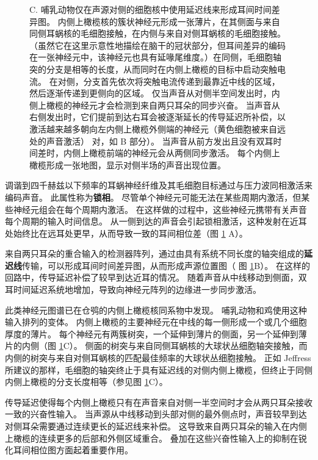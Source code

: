 \begin{figure}[htbp]
{		C. 哺乳动物仅在声源对侧的细胞核中使用延迟线来形成耳间时间差异图。
		内侧上橄榄核的簇状神经元形成一张薄片，在其侧面与来自同侧耳蜗核的毛细胞接触，在内侧与来自对侧耳蜗核的毛细胞接触。 
		（虽然它在这里示意性地描绘在脑干的冠状部分，但耳间差异的编码在一张神经元中，该神经元也具有延喙尾维度。）在同侧，毛细胞轴突的分支是相等的长度，从而同时在内侧上橄榄的目标中启动突触电流。
		在对侧，分支首先依次将突触电流传递到最靠近中线的区域，然后逐渐传递到更侧向的区域。
		仅当声音从对侧半空间发出时，内侧上橄榄的神经元才会检测到来自两只耳朵的同步兴奋。
		当声音从右侧发出时，它们提前到达右耳会被逐渐延长的传导延迟所补偿，以激活越来越多朝向左内侧上橄榄外侧端的神经元（黄色细胞被来自远处的声音激活） 对，如 B 部分）。
		当声音从前方发出且没有双耳时间差时，内侧上橄榄前端的神经元会从两侧同步激活。
		每个内侧上橄榄形成一张地图，显示对侧半场的声音出现位置\cite{yin2002neural}。}
	\label{fig:28_5}
\end{figure}

调谐到四千赫兹以下频率的耳蜗神经纤维及其毛细胞目标通过与压力波同相激活来编码声音。
此属性称为\textbf{锁相}。
尽管单个神经元可能无法在某些周期内激活，但某些神经元组会在每个周期内激活。
在这样做的过程中，这些神经元携带有关声音每个周期的输入时间信息。 
从一侧到达的声音会引起锁相激活，这种发射在近耳处始终比在远耳处更早，从而导致一致的耳间相位差（图 \ref{fig:28_5} A）。


来自两只耳朵的重合输入的检测器阵列，通过由具有系统不同长度的轴突组成的\textbf{延迟线}传输，可以形成耳间时间差异图，从而形成声源位置图\cite{jeffress1948place}（ 图 \ref{fig:28_5}B）。
在这样的回路中，传导延迟补偿了较早到达近耳的情况。
随着声音从中线移动到侧面，双耳时间延迟系统地增加，导致向神经元阵列的边缘进一步同步激活。


此类神经元图谱已在仓鸮的内侧上橄榄核同系物中发现。
哺乳动物和鸡使用这种输入排列的变体。
内侧上橄榄的主要神经元在中线的每一侧形成一个或几个细胞厚度的薄片。 
每个神经元有两簇树突，一个延伸到薄片的侧面，另一个延伸到薄片的内侧（图 \ref{fig:28_5}C）。
侧面的树突与来自同侧耳蜗核的大球状丛细胞轴突接触，而内侧的树突与来自对侧耳蜗核的匹配最佳频率的大球状丛细胞接触。
正如 Jeffress 所建议的那样，毛细胞的轴突终止于具有延迟线的对侧内侧上橄榄，但终止于同侧内侧上橄榄的分支长度相等（参见图 \ref{fig:28_5}C）。


传导延迟使得每个内侧上橄榄只有在声音来自对侧一半空间时才会从两只耳朵接收一致的兴奋性输入。
当声源从中线移动到头部对侧的最外侧点时，声音较早到达对侧耳朵需要通过连续更长的延迟线来补偿。
这导致来自两只耳朵的输入在内侧上橄榄的连续更多的后部和外侧区域重合。
叠加在这些兴奋性输入上的抑制在锐化耳间相位图方面起着重要作用。


